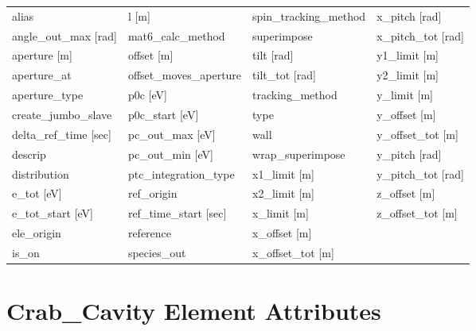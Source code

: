  \begin{tabular}{llll} \toprule
alias                            & l [m]                            & spin_tracking_method             & x_pitch [rad]                    \\
angle_out_max [rad]              & mat6_calc_method                 & superimpose                      & x_pitch_tot [rad]                \\
aperture [m]                     & offset [m]                       & tilt [rad]                       & y1_limit [m]                     \\
aperture_at                      & offset_moves_aperture            & tilt_tot [rad]                   & y2_limit [m]                     \\
aperture_type                    & p0c [eV]                         & tracking_method                  & y_limit [m]                      \\
create_jumbo_slave               & p0c_start [eV]                   & type                             & y_offset [m]                     \\
delta_ref_time [sec]             & pc_out_max [eV]                  & wall                             & y_offset_tot [m]                 \\
descrip                          & pc_out_min [eV]                  & wrap_superimpose                 & y_pitch [rad]                    \\
distribution                     & ptc_integration_type             & x1_limit [m]                     & y_pitch_tot [rad]                \\
e_tot [eV]                       & ref_origin                       & x2_limit [m]                     & z_offset [m]                     \\
e_tot_start [eV]                 & ref_time_start [sec]             & x_limit [m]                      & z_offset_tot [m]                 \\
ele_origin                       & reference                        & x_offset [m]                     &                                  \\
is_on                            & species_out                      & x_offset_tot [m]                 &                                  \\
 \bottomrule
 \end{tabular}
 \vfill
 
 \section{Crab_Cavity Element Attributes}
 \label{s:list.crab.cavity}
 
